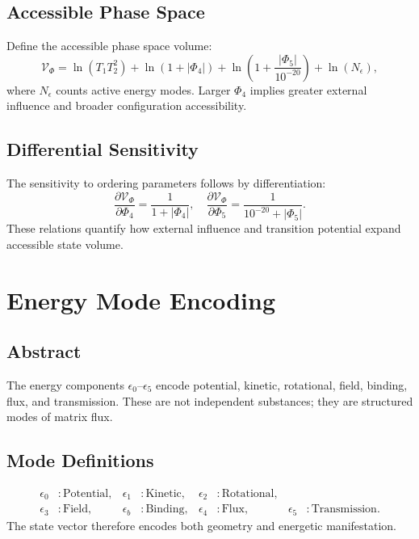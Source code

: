 \documentclass[12pt]{book}
\begin{document}
\section{Accessible Phase Space}
Define the accessible phase space volume:
\begin{equation}
\mathcal{V}_{\Phi} = \ln\left(T_1 T_2^2\right) + \ln(1+|\Phi_4|) + \ln\left(1+\frac{|\Phi_5|}{10^{-20}}\right) + \ln(N_{\epsilon}),
\end{equation}
where $N_{\epsilon}$ counts active energy modes. Larger $\Phi_4$ implies greater external influence and
broader configuration accessibility.

\section{Differential Sensitivity}
The sensitivity to ordering parameters follows by differentiation:
\begin{equation}
\frac{\partial \mathcal{V}_{\Phi}}{\partial \Phi_4} = \frac{1}{1+|\Phi_4|},\quad
\frac{\partial \mathcal{V}_{\Phi}}{\partial \Phi_5} = \frac{1}{10^{-20} + |\Phi_5|}.
\end{equation}
These relations quantify how external influence and transition potential expand accessible state volume.

\chapter{Energy Mode Encoding}

\section*{Abstract}
The energy components $\epsilon_0$–$\epsilon_5$ encode potential, kinetic, rotational, field, binding,
flux, and transmission. These are not independent substances; they are structured modes of matrix flux.

\section{Mode Definitions}
\begin{align}
\epsilon_0 &: \text{Potential}, &
\epsilon_1 &: \text{Kinetic}, &
\epsilon_2 &: \text{Rotational},\\
\epsilon_3 &: \text{Field}, &
\epsilon_b &: \text{Binding}, &
\epsilon_4 &: \text{Flux}, &
\epsilon_5 &: \text{Transmission}.
\end{align}
The state vector therefore encodes both geometry and energetic manifestation.
\end{document}
